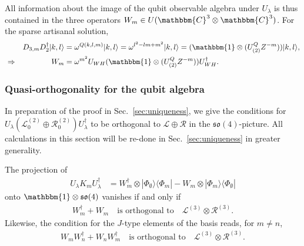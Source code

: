 \documentclass[aps,nofootinbib,floatfix,a4paper]{revtex4}
\newcommand{\1}{\mbox{$\mathbf{1}$}}
\def\CC{\mathbbm{C}}
\def\R{\mathcal{R}}
\def\Id{\mathbbm{1}}
\begin{document}
All information about the image of the qubit observable algebra under $U_\lambda$ is thus contained in the three operators $W_m \in U(\CC^3\otimes\CC^3)$.
For the sparse artisanal solution,
\begin{align}
		&&
		D_{3,m} D_2^\dagger|k,l\rangle
		&=
		\omega^{Q(k,l,m)}
		|k,l\rangle
		= 
		\omega^{l^2-lm+m^2} 
		|k,l\rangle
		=
		(\Id\otimes (U^Q_{(2)} Z^{-m}))
		|k,l\rangle
		,
		\\
		\label{eqn:w_preimage}
		&\Rightarrow&
		W_m
		&= 
		\omega^{m^2} 
		U_{WH}
		(\Id\otimes (U^Q_{(2)} Z^{-m}))
		U_{WH}^\dagger 
		.
\end{align}
\subsubsection{Quasi-orthogonality for the qubit algebra}

In preparation of the proof in Sec.~\ref{sec:uniqueness}, we give the conditions for
$U_\lambda(\mathcal{L}_0^{(2)} \oplus \mathcal{R}_0^{(2)})U_\lambda^\dagger$  
to be orthogonal to $\mathcal{L}\oplus\R$ in the $\mathfrak{so}(4)$-picture.
All calculations in this section will be re-done in Sec.~\ref{sec:uniqueness} in greater generality.

%

The projection of 
\begin{align*}
	U_\lambda 
	K_m
	U_\lambda^\dagger
	&=
	W_m^\dagger \otimes |\Phi_\emptyset\rangle\langle\Phi_m| 
	-
	W_m \otimes |\Phi_m\rangle\langle\Phi_\emptyset|
\end{align*}
onto $\Id\otimes \mathfrak{so}(4)$ vanishes if and only if 
\begin{align}\label{eqn:k_condition}
	W_m^\dagger + W_m
	\quad\text{is orthogonal to}\quad 
	\mathcal{L}^{(3)}\otimes\mathcal{R}^{(3)}.
\end{align}
Likewise, the condition for the $J$-type elements of the basis reads, for $m\neq n$,
\begin{align}\label{eqn:j_condition}
	W_mW_n^\dagger + W_nW_m^\dagger
	\quad\text{is orthogonal to}\quad 
	\mathcal{L}^{(3)}\otimes\mathcal{R}^{(3)}.
\end{align}
\end{document}
